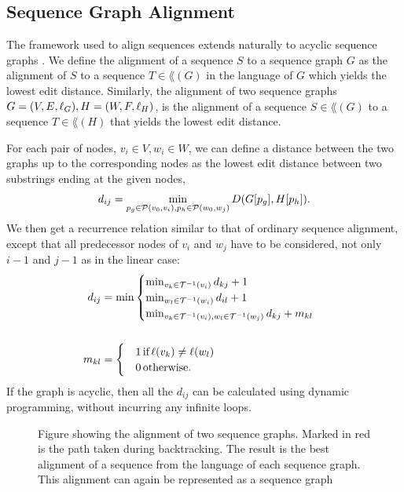 \subsection{Sequence Graph Alignment}
The framework used to align sequences extends naturally to acyclic sequence graphs \cite{hein, poa}.
We define the alignment of a sequence $S$ to a sequence graph $G$ as the alignment of $S$ to a sequence $T \in \lang(G)$ in the language of $G$ which yields the lowest edit distance.
Similarly, the alignment of two sequence graphs $G=(V, E, \slabel_G), H=(W, F, \slabel_H)$, is the alignment of a sequence $S \in \lang(G)$ to a sequence $T \in \lang(H)$ that yields the lowest edit distance.

For each pair of nodes, $v_i \in V, w_i \in W$, we can define a distance between the two graphs up to the corresponding nodes as the lowest edit distance between two substrings ending at the given nodes,
\[
  d_{ij} = \min_{p_g \in \paths(v_0, v_i), p_h \in \paths(w_0, w_j)} D(G[p_g], H[p_h]).
\]
We then get a recurrence relation similar to that of ordinary sequence alignment, except that all predecessor nodes of $v_i$ and $w_j$ have to be considered, not only $i-1$ and $j-1$ as in the linear case:
\begin{align*}
  d_{ij} &= \min \begin{cases}
    \min_{v_k \in \preds(v_i)} d_{kj} + 1\\
    \min_{w_l \in \preds(w_i)} d_{il} +1 \\
    \min_{v_k \in \preds(v_i), w_l \in \preds(w_j)} d_{kj}+m_{kl}\\
  \end{cases}\\
\\
  m_{kl} &= \begin{cases}
    &1\, \text{if}\, \slabel(v_k) \neq \slabel(w_l)\\
    &0\, \text{otherwise}.\\
    \end{cases}
\end{align*}
If the graph is acyclic, then all the $d_{ij}$ can be calculated using dynamic programming, without incurring any infinite loops.
\begin{figure}
  \centering
  \begin{tikzpicture}
    
  \end{tikzpicture}
  \caption{
    Figure showing the alignment of two sequence graphs.
    Marked in red is the path taken during backtracking.
    The result is the best alignment of a sequence from the language of each sequence graph.
    This alignment can again be represented as a sequence graph}
    \label{fig:seqgrapha}
\end{figure}

